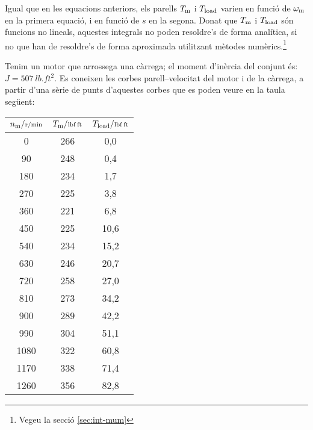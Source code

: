 Igual que en les equacions anteriors, els parells $T\ped{m}$ i $T\ped{load}$ varien en funció de $\omega\ped{m}$ en la primera equació, i en funció de $s$ en la segona. Donat que $T\ped{m}$ i $T\ped{load}$ són funcions no lineals, aquestes integrals no poden resoldre's de forma analítica, si no que han de resoldre's de forma aproximada utilitzant mètodes numèrics.\footnote{Vegeu la secció \ref{sec:int-mum}}

\begin{exemple}
Tenim un motor que arrossega una càrrega; el moment d'inèrcia del conjunt és: $J = \SI{507}{lb.ft^2}$. Es coneixen les corbes parell--velocitat del motor i de la càrrega, a partir d'una sèrie de punts d'aquestes corbes que es poden veure en la taula següent:

\begin{center}
    \begin{tabular}{S[table-format=4.0]S[table-format=3.0]S[table-format=3.1]}
    \toprule[1pt]
    $n\ped{m}/{\scriptstyle \si{r/min}}$ &  $T\ped{m}/{\scriptstyle \si{lbf.ft}}$   & $T\ped{load}/{\scriptstyle \si{lbf.ft}}$  \\
    	   &  266  &   0,0    \\
     90	   &  248  &   0,4    \\
     180   &  234  &   1,7    \\
     270   &  225  &   3,8    \\
     360   &  221  &   6,8    \\
     450   &  225  &   10,6   \\
     540   &  234  &   15,2   \\
     630   &  246  &   20,7   \\
     720   &  258  &   27,0   \\
     810   &  273  &   34,2   \\
     900   &  289  &   42,2   \\
     990   &  304  &   51,1   \\
     1080  &  322  &   60,8   \\
     1170  &  338  &   71,4   \\
     1260  &  356  &   82,8   \\
     \midrule
    \end{tabular}
\end{center}


\end{exemple}

